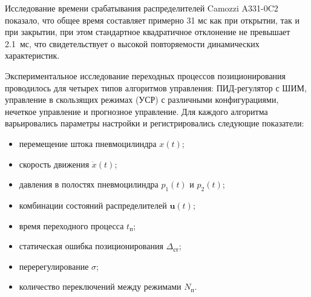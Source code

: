 Исследование времени срабатывания распределителей Camozzi A331-0C2 показало, что общее время
составляет примерно 31 мс как при открытии, так и при закрытии,
при этом стандартное квадратичное отклонение не превышает \num{2.1}~мс, что
свидетельствует о высокой повторяемости динамических характеристик.

Экспериментальное исследование переходных процессов позиционирования проводилось для четырех типов
алгоритмов управления: ПИД-регулятор с ШИМ, управление в скользящих режимах (УСР) с
различными конфигурациями, нечеткое управление и прогнозное управление. Для каждого алгоритма варьировались параметры настройки и регистрировались следующие показатели:

\begin{itemize}
	\item перемещение штока пневмоцилиндра $x(t)$;
	\item скорость движения $\dot{x}(t)$;
	\item давления в полостях пневмоцилиндра $p_1(t)$ и $p_2(t)$;
	\item комбинации состояний распределителей $\mathbf{u}(t)$;
	\item время переходного процесса $t_{\text{п}}$;
	\item статическая ошибка позиционирования $\Delta_{\text{ст}}$;
	\item перерегулирование $\sigma$;
	\item количество переключений между режимами $N_{\text{п}}$.
\end{itemize}


